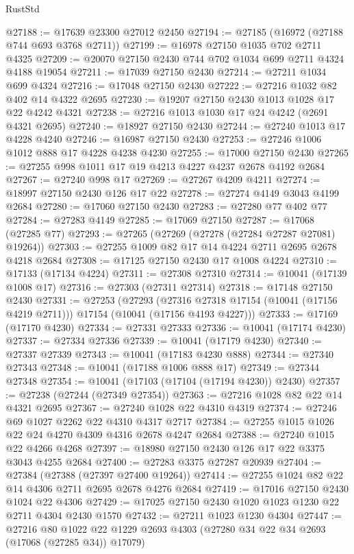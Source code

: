 \begin{lexlean}{RustStd}
\begin{coremodule}
@27188 := @17639 @23300 @27012 @2450
@27194 := @27185 (@16972 (@27188 @744 @693 @3768 @2711))
@27199 := @16978 @27150 @1035 @702 @2711 @4325
@27209 := @20070 @27150 @2430 @744 @702 @1034 @699 @2711 @4324 @4188 @19054
@27211 := @17039 @27150 @2430
@27214 := @27211 @1034 @699 @4324
@27216 := @17048 @27150 @2430
@27222 := @27216 @1032 @82 @402 @14 @4322 @2695
@27230 := @19207 @27150 @2430 @1013 @1028 @17 @22 @4242 @4321
@27238 := @27216 @1013 @1030 @17 @24 @4242 (@2691 @4321 @2695)
@27240 := @18927 @27150 @2430
@27244 := @27240 @1013 @17 @4228 @4240
@27246 := @16987 @27150 @2430
@27253 := @27246 @1006 @1012 @888 @17 @4228 @4238 @4230
@27255 := @17000 @27150 @2430
@27265 := @27255 @998 @1011 @17 @19 @4213 @4227 @4237 @2678 @4192 @2684
@27267 := @27240 @998 @17
@27269 := @27267 @4209 @4211
@27274 := @18997 @27150 @2430 @126 @17 @22
@27278 := @27274 @4149 @3043 @4199 @2684
@27280 := @17060 @27150 @2430
@27283 := @27280 @77 @402 @77
@27284 := @27283 @4149
@27285 := @17069 @27150
@27287 := @17068 (@27285 @77)
@27293 := @27265 (@27269 (@27278 (@27284 @27287 @27081) @19264))
@27303 := @27255 @1009 @82 @17 @14 @4224 @2711 @2695 @2678 @4218 @2684
@27308 := @17125 @27150 @2430 @17 @1008 @4224
@27310 := @17133 (@17134 @4224)
@27311 := @27308 @27310
@27314 := @10041 (@17139 @1008 @17)
@27316 := @27303 (@27311 @27314)
@27318 := @17148 @27150 @2430
@27331 := @27253
    (@27293
      (@27316 @27318 @17154 (@10041 (@17156 @4219 @2711)))
      @17154
      (@10041 (@17156 @4193 @4227)))
@27333 := @17169 (@17170 @4230)
@27334 := @27331 @27333
@27336 := @10041 (@17174 @4230)
@27337 := @27334 @27336
@27339 := @10041 (@17179 @4230)
@27340 := @27337 @27339
@27343 := @10041 (@17183 @4230 @888)
@27344 := @27340 @27343
@27348 := @10041 (@17188 @1006 @888 @17)
@27349 := @27344 @27348
@27354 := @10041 (@17103 (@17104 (@17194 @4230)) @2430)
@27357 := @27238 (@27244 (@27349 @27354))
@27363 := @27216 @1028 @82 @22 @14 @4321 @2695
@27367 := @27240 @1028 @22 @4310 @4319
@27374 := @27246 @69 @1027 @2262 @22 @4310 @4317 @2717
@27384 := @27255 @1015 @1026 @22 @24 @4270 @4309 @4316 @2678 @4247 @2684
@27388 := @27240 @1015 @22 @4266 @4268
@27397 := @18980 @27150 @2430 @126 @17 @22 @3375 @3043 @4255 @2684
@27400 := @27283 @3375 @27287 @20939
@27404 := @27384 (@27388 (@27397 @27400 @19264))
@27414 := @27255 @1024 @82 @22 @14 @4306 @2711 @2695 @2678 @4276 @2684
@27419 := @17016 @27150 @2430 @1024 @22 @4306
@27429 := @17025 @27150 @2430 @1020 @1023 @1230 @22 @2711 @4304 @2430 @1570
@27432 := @27211 @1023 @1230 @4304
@27447 := @27216
    @80
    @1022
    @22
    @1229
    @2693
    @4303
    (@27280 @34 @22 @34 @2693 (@17068 (@27285 @34)) @17079)

\end{coremodule}
\end{lexlean}
